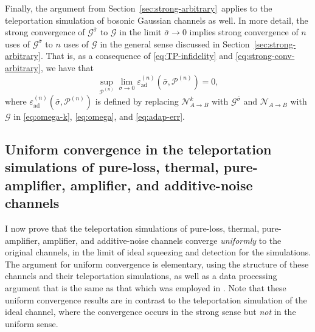 \documentclass[apsrev,twocolumn]{revtex4-1}%
\begin{document}
Finally, the argument from Section~\ref{sec:strong-arbitrary}\ applies to the
teleportation simulation of bosonic Gaussian channels as well. In more detail,
the strong convergence of $\mathcal{G}^{\bar{\sigma}}$ to $\mathcal{G}$ in the
limit $\bar{\sigma}\rightarrow0$ implies strong convergence of $n$ uses of
$\mathcal{G}^{\bar{\sigma}}$ to $n$ uses of $\mathcal{G}$ in the general sense
discussed in Section~\ref{sec:strong-arbitrary}. That is, as a consequence of
\eqref{eq:TP-infidelity} and \eqref{eq:strong-conv-arbitrary}, we have that%
\begin{equation}
\sup_{\mathcal{P}^{(n)}}\lim_{\bar{\sigma}\rightarrow0}\varepsilon_{\text{ad}%
}^{(n)}(\bar{\sigma},\mathcal{P}^{(n)})=0,
\label{eq:strong-converge-tele-adap}%
\end{equation}
where $\varepsilon_{\text{ad}}^{(n)}(\bar{\sigma},\mathcal{P}^{(n)})$ is
defined by replacing $\mathcal{N}_{A\rightarrow B}^{k}$ with $\mathcal{G}%
^{\bar{\sigma}}$ and $\mathcal{N}_{A\rightarrow B}$ with $\mathcal{G}$ in
\eqref{eq:omega-k}, \eqref{eq:omega}, and \eqref{eq:adap-err}.



\subsection{Uniform convergence in the teleportation simulations of pure-loss,
thermal, pure-amplifier, amplifier, and additive-noise channels}

\label{sec:unif-conv-loss-amp}I now prove that the teleportation simulations
of pure-loss, thermal, pure-amplifier, amplifier, and additive-noise channels
converge \textit{uniformly} to the original channels, in the limit of ideal
squeezing and detection for the simulations. The argument for uniform
convergence is elementary, using the structure of these channels and their
teleportation simulations, as well as a data processing argument that is the
same as that which was employed in \cite{TW16,SWAT17}. Note that these uniform
convergence results are in contrast to the teleportation simulation of the
ideal channel, where the convergence occurs in the strong sense but
\textit{not} in the uniform sense.
\end{document}
